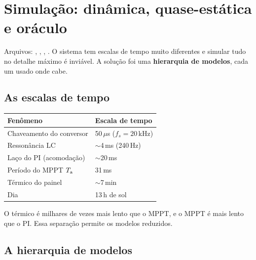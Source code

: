 \section{Simula\c{c}\~ao: din\^amica, quase-est\'atica e or\'aculo}\label{sec:sim}

Arquivos: , , , . O sistema tem escalas
de tempo muito diferentes e simular tudo no detalhe m\'aximo \'e invi\'avel. A solu\c{c}\~ao foi uma \textbf{hierarquia de modelos}, cada um usado onde cabe.

\subsection{As escalas de tempo}

\begin{center}\small
\begin{tabular}{@{}ll@{}}
\toprule
Fen\^omeno & Escala de tempo \\ \midrule
Chaveamento do conversor & 50\,$\mu$s ($f_s=20$\,kHz) \\
Resson\^ancia LC & $\sim$4\,ms (240\,Hz) \\
La\c{c}o do PI (acomoda\c{c}\~ao) & $\sim$20\,ms \\
Per\'iodo do MPPT $T_{\mathrm{a}}$ & 31\,ms \\
T\'ermico do painel & $\sim$7\,min \\
Dia & 13\,h de sol \\
\bottomrule
\end{tabular}
\end{center}

O t\'ermico \'e milhares de vezes mais lento que o MPPT, e o MPPT \'e mais lento que o PI. Essa separa\c{c}\~ao permite os modelos reduzidos.

\subsection{A hierarquia de modelos}

